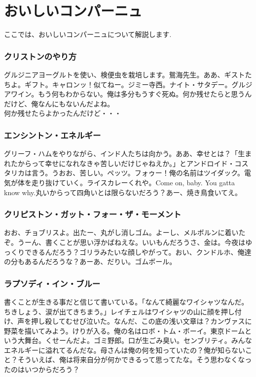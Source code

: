 \documentclass[fleqn,leqno,autodetect-engine,dvipdfmx-if-dvi,ja=standard]{bxjsarticle}
\begin{document}
\part{おいしいコンパーニュ}
ここでは、おいしいコンパーニュについて解説します.

\section{クリストンのやり方}
グルジニアヨーグルトを使い、検便虫を栽培します。鴛海先生。ああ、ギストたちよ。ギフト。キャロンッ！似てねー。ジミー寺西。ナイト・サタデー。グルジアワイン。もう何もわからない。俺は多分もうすぐ死ぬ。何か残せたらと思うんだけど、俺なんにもないんだよね。\\

何か残せたらよかったんだけど・・・

\section{エンシントン・エネルギー}
グリーフ・ハムをやりながら、インド人たちは向かう。{\Large ああ、幸せとは？}「生まれたからって幸せになれなきゃ苦しいだけじゃねえか。」とアンドロイド・コスタリカは言う。うおお、苦しい。ペッツ。フォゥー！俺の名前はツイダック。電気が体を走り抜けていく。ライスカレーくれや。Come on, baby. You gatta know why.丸いからって四角いとは限らないだろう？あー、焼き鳥食いてえ。

\section{クリピストン・ガット・フォー・ザ・モーメント}
おお、チョブリスよ。出たー、丸がし消しゴム。よーし、メルボルンに着いたぞ。うーん、書くことが思い浮かばねえな。いいもんだろうさ、金は。今夜はゆっくりできるんだろう？ゴリラみたいな顔しやがって。おい、クンドルホ、俺達の分もあるんだろうな？あーあ、だりい。ゴムボール。

\section{ラプソディ・イン・ブルー}
書くことが生きる事だと信じて書いている。{\large {}}「なんて綺麗なワイシャツなんだ。ちきしょう、涙が出てきちまう。」レイチェルはワイシャツの山に顔を押し付け、声を押し殺してむせび泣いた。なんだ、この底の浅い文章は？カンヴァスに野菜を描いてみよう。けりが入る。俺の名はロボ・トム・ボーイ。東京ドームという大舞台。くせーんだよ。ゴミ野郎。口が生ごみ臭い。センブリティ。みんなエネルギーに溢れてるんだな。母さんは俺の何を知っていたの？俺が知らないこと？そういえば、俺は将来自分が何かできるって思ってたな。そう思わなくなったのはいつからだろう？
\end{document}

